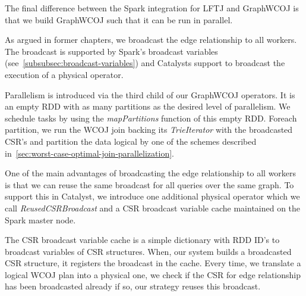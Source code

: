 The final difference between the Spark integration for \textsc{LFTJ} and GraphWCOJ is that we build GraphWCOJ such that it can
be run in parallel.

As argued in former chapters, we broadcast the edge relationship to all workers.
The broadcast is supported by Spark's broadcast variables (see~\cref{subsubsec:broadcast-variables}) and Catalysts support to broadcast
the execution of a physical operator.

Parallelism is introduced via the third child of our GraphWCOJ operators.
It is an empty RDD with as many partitions as the desired level of parallelism.
We schedule tasks by using the \textit{mapPartitions} function of this empty RDD.
Foreach partition, we run the \textsc{WCOJ} join backing its \textit{TrieIterator} with the broadcasted CSR's and partition the data
logical by one of the schemes described in~\cref{sec:worst-case-optimal-join-parallelization}.

One of the main advantages of broadcasting the edge relationship to all workers is that we can reuse the same broadcast for all queries
over the same graph.
To support this in Catalyst, we introduce one additional physical operator which we call \textit{ReusedCSRBroadcast} and a CSR broadcast
variable cache maintained on the Spark master node.

The CSR broadcast variable cache is a simple dictionary with RDD ID's to broadcast variables of CSR structures.
When, our system builds a broadcasted CSR structure, it registers the broadcast in the cache.
Every time, we translate a logical WCOJ plan into a physical one, we check if the CSR for edge relationship has been broadcasted already
if so, our strategy reuses this broadcast.





